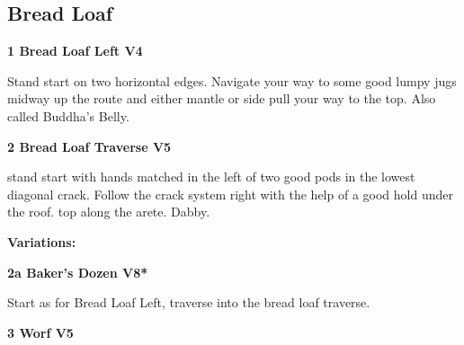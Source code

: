 \begin{multicols}{2}
	
	


		\needspace{1.5cm}
		\subsection*{Bread Loaf}\label{bf:Bread Loaf}
			
		
			
			\needspace{1.5cm}
\label{rt:Bread Loaf Left}
\colorbox{RoyalBlue!20}{
\parbox{0.95\linewidth}{
\textbf{
1 Bread Loaf Left V4  
}}}

			\begin{adjustwidth}{0.5cm}{}			
			Stand start on two horizontal edges. Navigate your way to some good lumpy jugs midway up the route and either mantle or side pull your way to the top. Also called Buddha's Belly.
			\end{adjustwidth}
			
			
			
			\needspace{1.5cm}
\label{rt:Bread Loaf Traverse}
\colorbox{RoyalBlue!20}{
\parbox{0.95\linewidth}{
\textbf{
2 Bread Loaf Traverse V5  
}}}

			\begin{adjustwidth}{0.5cm}{}			
			stand start with hands matched in the left of two good pods in the lowest diagonal crack. Follow the crack system right with the help of a good hold under the roof. top along the arete. Dabby.
			\end{adjustwidth}
			
				\begin{adjustwidth}{0.5cm}{}				
				\needspace{3cm}
				\textbf{Variations:} \newline
					
					\needspace{1.5cm}
\label{vr:Baker's Dozen}
\colorbox{Goldenrod!50}{
\parbox{0.95\linewidth}{
\textbf{
2a Baker's Dozen V8*  
}}}

					\begin{adjustwidth}{0.5cm}{}			
					Start as for Bread Loaf Left, traverse into the bread loaf traverse.
					\end{adjustwidth}
					
					
				\end{adjustwidth}
			


			\needspace{1.5cm}
\label{rt:Worf}
\colorbox{RoyalBlue!20}{
\parbox{0.95\linewidth}{
\textbf{
3 Worf V5  
}}}


\end{multicols}
